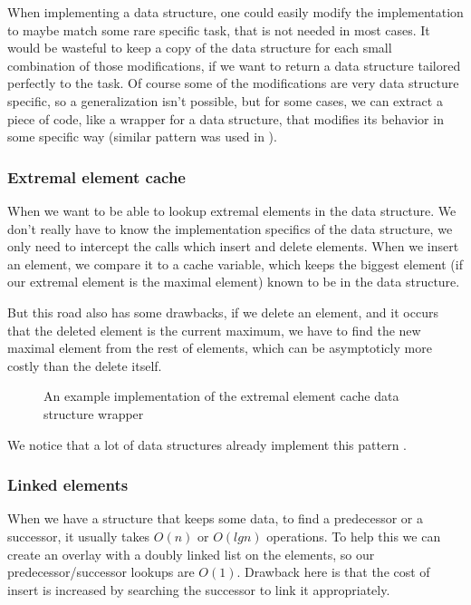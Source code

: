 \documentclass[a4paper,11pt]{article}
\begin{document}
		When implementing a data structure, one could easily modify the implementation to maybe match some rare
		specific task, that is not needed in most cases. It would be wasteful to keep a copy of the data
		structure for each small combination of those modifications, if we want to return a data structure
		tailored perfectly to the task. Of course some of the modifications are very data structure specific, so
		a generalization isn't possible, but for some cases, we can extract a piece of code, like a wrapper for
        a data structure, that modifies its behavior in some specific way (similar pattern was used in
        \cite{Okasaki}).

		\subsubsection{Extremal element cache}

			When we want to be able to lookup extremal elements in the data structure. We don't really have
			to know the implementation specifics of the data structure, we only need to intercept the calls
			which insert and delete elements. When we insert an element, we compare it to a cache variable,
			which keeps the biggest element (if our extremal element is the maximal element) known to be in
			the data structure.

			But this road also has some drawbacks, if we delete an element, and it occurs that the deleted
			element is the current maximum, we have to find the new maximal element from the rest of
			elements, which can be asymptoticly more costly than the delete itself.


			\begin{figure}
				

				\caption{An example implementation of the extremal element cache data structure wrapper}

				\label{fig:elem-cache}
			\end{figure}

			We notice that a lot of data structures already implement this pattern \cite{Wiveb}.

        \subsubsection{Linked elements}\label{sec:gdsm:le}

			When we have a structure that keeps some data, to find a predecessor or a successor, it usually
			takes $O(n)$ or $O(lg n)$ operations.  To help this we can create an overlay with a doubly
			linked list on the elements, so our predecessor/successor lookups are $O(1)$. Drawback here is
			that the cost of insert is increased by searching the successor to link it appropriately.
\end{document}
